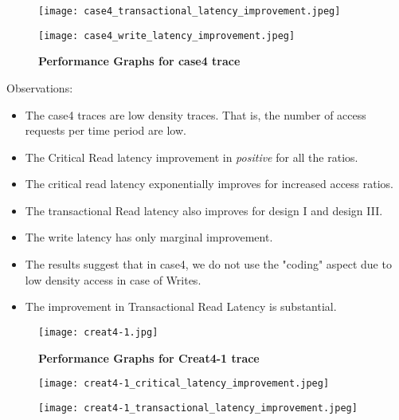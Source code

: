 \begin{landscape}
\begin{figure}[htb]
\begin{minipage}[!t]{0.33\linewidth}
        \texttt{[image: case4\_transactional\_latency\_improvement.jpeg]}
\end{minipage}
\begin{minipage}[!t]{0.33\linewidth}
        \texttt{[image: case4\_write\_latency\_improvement.jpeg]}
\end{minipage}
\caption{
{\bf Performance Graphs for case4 trace} }
\label{fig:case4_improvement}
\end{figure}
Observations:
\begin{itemize}
	\item The case4 traces are low density traces. That is, the number of access requests per time period are low. 
	\item The Critical Read latency improvement in {\em positive} for all the ratios. 
	\item The critical read latency exponentially improves for increased access ratios.
	\item The transactional Read latency also improves for design I and design III. 
	\item The write latency has only marginal improvement. 
	\item The results suggest that in case4, we do not use the "coding" aspect due to low density access in case of Writes.
	\item The improvement in Transactional Read Latency is substantial. 
\end{itemize}
\cleardoublepage
\begin{figure}[htb]
\begin{minipage}[!t]{\linewidth}
        \texttt{[image: creat4-1.jpg]}
\end{minipage}
\caption{
{\bf Performance Graphs for Creat4-1 trace} }
\label{fig:creat41}
\end{figure}
\cleardoublepage
\begin{figure}[htb]
\begin{minipage}[!t]{0.33\linewidth}
        \texttt{[image: creat4-1\_critical\_latency\_improvement.jpeg]}
\end{minipage}
\begin{minipage}[!t]{0.33\linewidth}
        \texttt{[image: creat4-1\_transactional\_latency\_improvement.jpeg]}
\end{minipage}

\end{figure}
\end{landscape}
